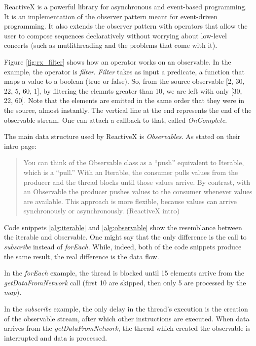 \documentclass[12pt,a4paper,twoside]{report}
\begin{document}
ReactiveX is a powerful library for asynchronous and event-based programming. It is an implementation of the observer pattern meant for event-driven programming. It also extends the observer pattern with operators that allow the user to compose sequences declaratively without worrying about low-level concerts (such as mutlithreading and the problems that come with it).

Figure \ref{fig:rx_filter} shows how an operator works on an observable. In the example, the operator is \textit{filter}. \textit{Filter} takes as input a predicate, a function that maps a value to a boolean (true or false). So, from the source observable [2, 30, 22, 5, 60, 1], by filtering the elemnts greater than 10, we are left with only [30, 22, 60]. Note that the elements are emitted in the same order that they were in the source, almost instantly. The vertical line at the end represents the end of the observable stream. One can attach a callback to that, called \textit{OnComplete}.

The main data structure used by ReactiveX is \textit{Observables}. As stated on their intro page:

\begin{quote}
  You can think of the Observable class as a “push” equivalent to Iterable, which is a “pull.” With an Iterable, the consumer pulls values from the producer and the thread blocks until those values arrive. By contrast, with an Observable the producer pushes values to the consumer whenever values are available. This approach is more flexible, because values can arrive synchronously or asynchronously. (ReactiveX intro)
\end{quote}

Code snippets \ref{alg:iterable} and \ref{alg:observable} show the resemblance between the iterable and observable. One might say that the only difference is the call to \textit{subscribe} instead of \textit{forEach}. While, indeed, both of the code snippets produce the same result, the real difference is the data flow.

In the \textit{forEach} example, the thread is blocked until 15 elements arrive from the \textit{getDataFromNetwork} call (first 10 are skipped, then only 5 are processed by the \textit{map}).

In the \textit{subscribe} example, the only delay in the thread's execution is the creation of the observable stream, after which other instructions are executed. When data arrives from the \textit{getDataFromNetwork}, the thread which created the observable is interrupted and data is processed.
\end{document}

